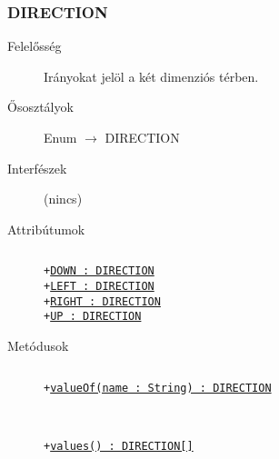 		\subsubsection{DIRECTION}
			\begin{description}

				\item[Felelősség] Irányokat jelöl a két dimenziós térben.

				\item[Ősosztályok] Enum $\rightarrow{}$ DIRECTION
				\item[Interfészek] (nincs)
				\item[Attribútumok]$\ $
					\begin{description}
						\item[\texttt{+\underline{DOWN : DIRECTION}}]%
						\item[\texttt{+\underline{LEFT : DIRECTION}}]%
						\item[\texttt{+\underline{RIGHT : DIRECTION}}]%
						\item[\texttt{+\underline{UP : DIRECTION}}]%
					\end{description}
				\item[Metódusok]$\ $
					\begin{description}
						\item[\texttt{+\underline{valueOf(name : String) : DIRECTION}}] \hfill \\
						\item[\texttt{+\underline{values() : DIRECTION[]}}] \hfill \\
					\end{description}
			\end{description}

